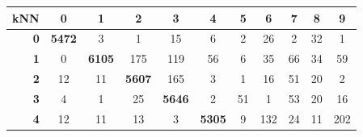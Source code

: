 \documentclass[
	12pt,				%
	openright,			%
	twoside,			%
	a4paper,			%
	english,			%
	brazil,				%
	svgnames
	]{abntex2}\usepackage[]{graphicx}\usepackage[]{color}
\begin{document}
\begin{table}[h]
\centering
\begin{tabular}{rcccccccccc}
\hline
\multicolumn{1}{r|}{\textbf{kNN}}         & \textbf{0}                         & \textbf{1}                         & \textbf{2}                         & \textbf{3}                         & \textbf{4}                         & \textbf{5}                         & \textbf{6}                         & \textbf{7}                         & \textbf{8}                         & \textbf{9}                         \\ \hline
\multicolumn{1}{r|}{\textbf{0}}           & \multicolumn{1}{c|}{\textbf{5472}} & 3                                  & 1                                  & 15                                 & 6                                  & 2                                  & 26                                 & 2                                  & 32                                 & 1                                  \\ \cline{2-3}
\multicolumn{1}{r|}{\textbf{1}}           & \multicolumn{1}{c|}{0}             & \multicolumn{1}{c|}{\textbf{6105}} & 175                                & 119                                & 56                                 & 6                                  & 35                                 & 66                                 & 34                                 & 59                                 \\ \cline{3-4}
\multicolumn{1}{r|}{\textbf{2}}           & 12                                 & \multicolumn{1}{c|}{11}            & \multicolumn{1}{c|}{\textbf{5607}} & 165                                & 3                                  & 1                                  & 16                                 & 51                                 & 20                                 & 2                                  \\ \cline{4-5}
\multicolumn{1}{r|}{\textbf{3}}           & 4                                  & 1                                  & \multicolumn{1}{c|}{25}            & \multicolumn{1}{c|}{\textbf{5646}} & 2                                  & 51                                 & 1                                  & 53                                 & 20                                 & 16                                 \\ \cline{5-6}
\multicolumn{1}{r|}{\textbf{4}}           & 12                                 & 11                                 & 13                                 & \multicolumn{1}{c|}{3}             & \multicolumn{1}{c|}{\textbf{5305}} & 9                                  & 132                                & 24                                 & 11                                 & 202                                \\ \cline{6-7}

\end{tabular}
\end{table}
\end{document}
